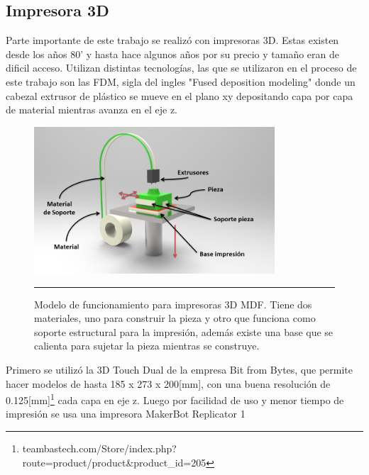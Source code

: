 \subsection{Impresora 3D} \label{cap:impresora3D}

Parte importante de este trabajo se realizó con impresoras 3D. Estas existen desde los años 80' y hasta hace algunos años por su precio y tamaño eran de dificil acceso. Utilizan distintas tecnologías, las que se utilizaron en el proceso de este trabajo son las FDM, sigla del ingles "Fused deposition modeling" donde un cabezal extrusor de plástico se mueve en el plano xy depositando capa por capa de material mientras avanza en el eje z.

\begin{figure}[htbp]
	\centering
		\includegraphics[width=0.8\textwidth]{./Figures/3Dprint.png}
		\rule{35em}{0.5pt}
	\caption[3Dprint]{Modelo de funcionamiento para impresoras 3D MDF. Tiene dos materiales, uno para construir la pieza y otro que funciona como soporte estructural para la impresión, además existe una base que se calienta para sujetar la pieza mientras se construye.}
	\label{fig:3Dprint}
\end{figure}	

Primero se utilizó la 3D Touch Dual de la empresa Bit from Bytes, que permite hacer modelos de hasta 185 x 273 x 200[mm], con una buena resolución de 0.125[mm]\footnote{teambastech.com/Store/index.php?route=product/product\&product\_id=205} cada capa en eje z. Luego por facilidad de uso y menor tiempo de impresión se usa una impresora MakerBot Replicator 1

